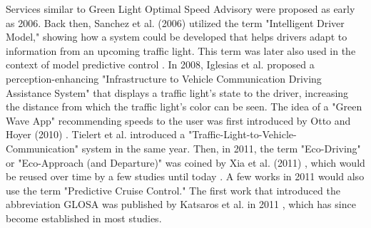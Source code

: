 Services similar to Green Light Optimal Speed Advisory were proposed as early as 2006. Back then, Sanchez et al. (2006) \cite{sanchez_predicting_2006} utilized the term "Intelligent Driver Model," showing how a system could be developed that helps drivers adapt to information from an upcoming traffic light. This term was later also used in the context of model predictive control \cite{xin_predictive_2018}. In 2008, Iglesias et al. \cite{iglesias_i2v_2008} proposed a perception-enhancing "Infrastructure to Vehicle Communication Driving Assistance System" that displays a traffic light's state to the driver, increasing the distance from which the traffic light's color can be seen. The idea of a "Green Wave App" recommending speeds to the user was first introduced by Otto and Hoyer (2010) \cite{otto_operating_2010}. Tielert et al. \cite{tielert_impact_2010} introduced a "Traffic-Light-to-Vehicle-Communication" system in the same year. Then, in 2011, the term "Eco-Driving" or "Eco-Approach (and Departure)" was coined by Xia et al. (2011) \cite{xia_indirect_2011}, which would be reused over time by a few studies until today \cite{rakha_eco-driving_2011, rakha_aeris_2012, xia_field_2012, hao_eco-approach_2019, hu_lane-level_2023}. A few works in 2011 \cite{asadi_predictive_2011, raubitschek_predictive_2011} would also use the term "Predictive Cruise Control." The first work that introduced the abbreviation GLOSA was published by Katsaros et al. in 2011 \cite{katsaros_performance_2011}, which has since become established in most studies.

